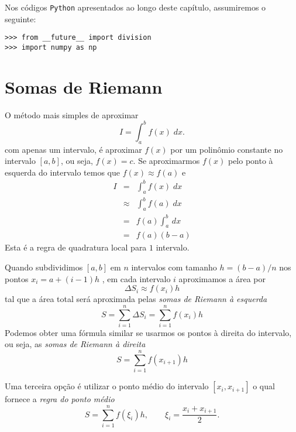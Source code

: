 \ifispython
Nos códigos \verb+Python+ apresentados ao longo deste capítulo, assumiremos o seguinte:
\begin{verbatim}
>>> from __future__ import division
>>> import numpy as np
\end{verbatim}
\fi

\section{Somas de Riemann}
O método mais simples de aproximar
\begin{equation}
 I = \int_a^b f(x) \;dx.
\end{equation}
com apenas um intervalo, é aproximar $f(x)$ por um polinômio constante no intervalo $[a,b]$, ou seja, $f(x)=c$. Se aproximarmos $f(x)$ pelo ponto à esquerda do intervalo temos que $f(x)\approx f(a)$ e
\begin{eqnarray}
 I &=& \int_a^b f(x) \;dx\\
   &\approx& \int_a^b f(a) \;dx \\
   &=& f(a) \int_a^b\,dx\\
   &=& f(a) (b-a)
\end{eqnarray}
Esta é a regra de quadratura local para $1$ intervalo.

Quando subdividimos $[a,b]$ em $n$ intervalos com tamanho $h=(b-a)/n$ nos pontos $x_i=a+(i-1)h$ , em cada intervalo $i$ aproximamos a área por
\begin{equation}
  \Delta S_i \approx f(x_i)h
\end{equation}
tal que a área total será aproximada pelas \emph{somas de Riemann à esquerda}
\begin{equation}
S =\sum_{i=1}^{n} \Delta S_i = \sum_{i=1}^{n} f(x_i) h
\end{equation}
Podemos obter uma fórmula similar se usarmos os pontos à direita do intervalo, ou seja, as \emph{somas de Riemann à direita}
\begin{equation}
S = \sum_{i=1}^{n} f(x_{i+1}) h
\end{equation}

Uma terceira opção é utilizar o ponto médio do intervalo $[x_i,x_{i+1}]$ o qual fornece a \emph{regra do ponto médio}
\begin{equation}\label{eq:regra_do_ponto_medio}
S = \sum_{i=1}^{n} f(\xi_i ) h, \qquad \xi_i=\frac{x_i+x_{i+1}}{2}.
\end{equation}

